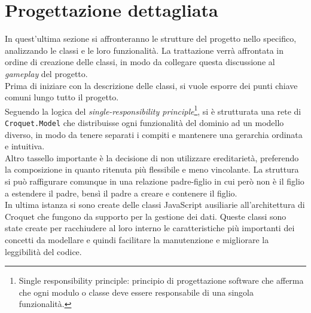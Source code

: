 \section{Progettazione dettagliata}\label{sec:progettazione}
In quest'ultima sezione si affronteranno le strutture del progetto nello specifico, analizzando le classi e le loro funzionalità. La trattazione verrà affrontata in ordine di 
creazione delle classi, in modo da collegare questa discussione al \textit{gameplay} del progetto.\\
\newline
Prima di iniziare con la descrizione delle classi, si vuole esporre dei punti chiave comuni lungo tutto il progetto.\\
Seguendo la logica del \textit{single-responsibility principle}\footnote{Single responsibility principle: principio di progettazione software che afferma che ogni modulo o classe deve
essere responsabile di una singola funzionalità.}, si è strutturata una rete di \texttt{Croquet.Model} che distribuisse ogni funzionalità del dominio ad un modello diverso, in modo da tenere separati i compiti e mantenere una
gerarchia ordinata e intuitiva.\\
Altro tassello importante è la decisione di non utilizzare ereditarietà, preferendo la composizione in quanto ritenuta più flessibile e meno vincolante. La struttura si può
raffigurare comunque in una relazione padre-figlio in cui però non è il figlio a estendere il padre, bensì il padre a creare e contenere il figlio.\\
In ultima istanza si sono create delle classi JavaScript ausiliarie all'architettura di Croquet che fungono da supporto per la gestione dei dati. Queste classi sono state create per 
racchiudere al loro interno le caratteristiche più importanti dei concetti da modellare e quindi facilitare la manutenzione e migliorare la leggibilità del codice.\\

